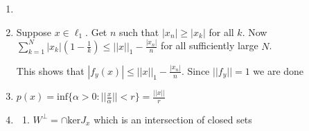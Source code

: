 \documentclass{article}
\newtheorem*{claim}{Claim}
\begin{document}
\begin{enumerate}
\begin{enumerate}
        let $f \in (c_0)^*$. 
        \begin{claim}
            $x=(\overline{fe_i}) \in \ell_1$
        \end{claim}

        \begin{proof}
            Define $a^n_i=\begin{cases}
                \overline{\frac{fe_i}{|fe_i|}} \text{ if }fe_i \neq 0 \text{ and } i \leq n \\
                0 \text{ else}
            \end{cases}$
            
            Then $fa^n=\sum_{i=1}^n|fe_i|$ 
        \end{proof}

        It is clear that $f$ and $f_x$ agree on $e_i$ and we are done by Problem 2.2

        \item see MIRA 7.26
        \item In $\ell_1$, let $W=\overline{\{\text{span }e_k\}_{k > N}}$
        
        From (a), we have $\ell_1/W \cong (c_0)^*/\overline{\{\text{span }fe_k\}_{k > N}}$

        We have the map $\text{drop}:\ell_1 \to \ell_1^N$ that takes the first $N$ slots. It has kernel $W$. Now for $x \in \ell_1$ we have $||x+W||=||\text{drop }x||$

        In $c_0$, let $H=\text{span}(e_1,..,e_N)$. By Problem 13, we have $H^* \cong (c_0)^*/H^\perp$.

    \end{enumerate}
    
    
    \item 
    \item Suppose $x \in \ell_1$. Get $n$ such that $|x_n| \geq |x_k|$ for all $k$. Now $\sum_{k=1}^N|x_k|(1-\frac{1}{k}) \leq ||x||_1 -\frac{|x_n|}{n}$ for all sufficiently large $N$. 
    
    This shows that $|f_y(x)| \leq ||x||_1-\frac{|x_n|}{n}$. Since $||f_y||=1$ we are done

    \item $p(x)=\text{inf}\{\alpha > 0: ||\frac{x}{\alpha}||<r\}=\frac{||x||}{r}$

    \item \begin{enumerate}
        \item $W^\perp= \cap \text{ker}J_x$ which is an intersection of closed sets
        

\end{enumerate}
\end{enumerate}
\end{document}
